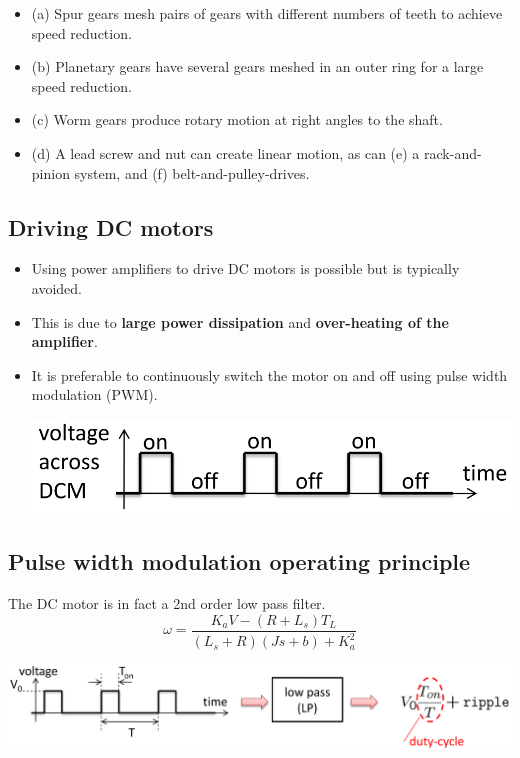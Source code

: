 \documentclass[11pt]{article}
\begin{document}
\begin{itemize}
\item (a) Spur gears mesh pairs of gears with different numbers of teeth to achieve speed reduction.
\item (b) Planetary gears have several gears meshed in an outer ring for a large speed reduction.
\item (c) Worm gears produce rotary motion at right angles to the shaft.
\item (d) A lead screw and nut can create linear motion, as can (e) a rack-and-pinion system, and (f) belt-and-pulley-drives.
\end{itemize}
\subsection{Driving DC motors}
\label{sec:orgfdd3058}
\begin{itemize}
\item Using power amplifiers to drive DC motors is possible but is typically avoided.
\item This is due to \textbf{large power dissipation} and \textbf{over-heating of the amplifier}.
\item It is preferable to continuously switch the motor on and off using pulse width modulation (PWM).
\begin{center}
\includegraphics[width=.9\linewidth]{./images/pulse-width-modulation-graph.png}
\end{center}
\end{itemize}
\subsection{Pulse width modulation operating principle}
\label{sec:org7dafeea}
The DC motor is in fact a 2nd order low pass filter.
\[\omega = \frac{K_a V - (R + L_s) T_L}{(L_s + R) (J s + b) + K_a^2}\]

\begin{center}
\includegraphics[width=.9\linewidth]{./images/pulse-width-modulation-operating-principle-diagram.png}
\end{center}
\end{document}
